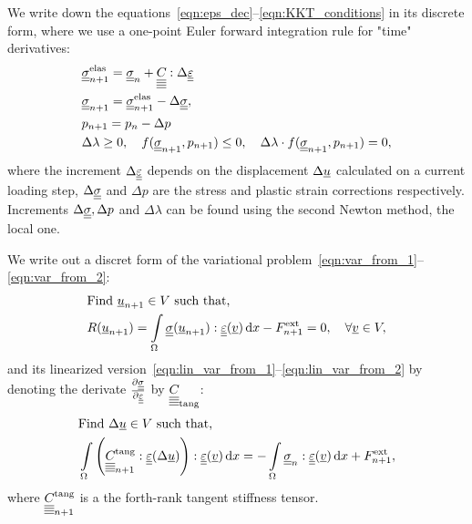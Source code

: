 \documentclass[12pt]{article}
\begin{document}
We write down the equations~\ref{eqn:eps_dec}--\ref{eqn:KKT_conditions} in its discrete form, where we use a one-point Euler forward integration rule for "time" derivatives:
\begin{align}
    & \uusigmanelas = \uusigma_n + \uuuuC{} : \Delta\uueps \\
    & \uusigman = \uusigmanelas - \Delta\uusigma, \\
    & p_{n+1} = p_n - \Delta p \\%
    & \Delta\lambda \geq 0, \quad f(\uusigman, p_{n+1}) \leq 0, \quad \Delta\lambda\cdot f(\uusigman, p_{n+1}) = 0, \label{eqn:KKT_disc}
\end{align}
where the increment $\Delta\underline{\underline{\varepsilon}}$ depends on the displacement $\Delta\underline{u}$ calculated on a current loading step, $\Delta\underline{\underline{\sigma}}$ and $\Delta p$ are the stress and plastic strain corrections respectively. Increments $\Delta\underline{\underline{\sigma}}, \Delta p$ and $\Delta\lambda$ can be found using the second Newton method, the local one.

We write out a discret form of the variational problem~\ref{eqn:var_from_1}--\ref{eqn:var_from_2}:
\begin{align}
    & \text{Find } \underline{u}_{n+1} \in V \text{ such that,} \label{eqn:var_disc_from_1} \\ 
    & R(\underline{u}_{n+1}) = \int\limits_\Omega\underline{\underline{\sigma}}(\underline{u}_{n+1}) : \underline{\underline{\varepsilon}}(\underline{v}) \, \mathrm{d} x - F_{n+1}^\text{ext} = 0, \quad \forall \underline{v} \in V \label{eqn:var_disc_from_2},
\end{align}
and its linearized version~\ref{eqn:lin_var_from_1}--\ref{eqn:lin_var_from_2} by denoting the derivate $\frac{\partial\underline{\underline{\sigma}}}{\partial\underline{\underline{\varepsilon}}}$ by $\underline{\underline{\underline{\underline{C_{}}}}}_{\text{tang}}$:
\begin{align}
    & \text{Find } \Delta\underline{u} \in V \text{ such that,} \label{eqn:lin_var_disc_from_1} \\ 
    & \int\limits_\Omega \left(\underline{\underline{\underline{\underline{C_{}}}}}_{n+1}^\text{tang} : \underline{\underline{\varepsilon}}(\Delta\underline{u})\right) : \underline{\underline{\varepsilon}}(\underline{v}) \, \mathrm{d} x = -\int\limits_\Omega\underline{\underline{\sigma}}_n : \underline{\underline{\varepsilon}}(\underline{v}) \, \mathrm{d} x + F^\text{ext}_{n+1} \label{eqn:lin_var_disc_from_2},
\end{align}
where $\underline{\underline{\underline{\underline{C_{}}}}}_{n+1}^{\text{tang}}$ is a the forth-rank tangent stiffness tensor.
\end{document}
